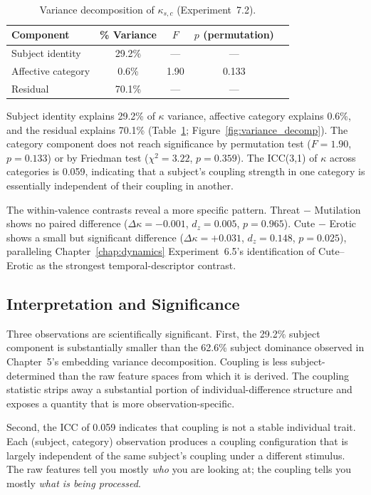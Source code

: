 \begin{table}[htbp]
\centering
\caption{Variance decomposition of $\kappa_{s,c}$ (Experiment~7.2).}
\label{tab:variance_decomp}
\small
\begin{tabular}{lcccc}
\toprule
\textbf{Component} & \textbf{\% Variance} & \textbf{$F$} & \textbf{$p$ (permutation)} \\
\midrule
Subject identity & 29.2\% & --- & --- \\
Affective category & 0.6\% & 1.90 & 0.133 \\
Residual & 70.1\% & --- & --- \\
\bottomrule
\end{tabular}
\end{table}

Subject identity explains 29.2\% of $\kappa$ variance, affective category explains 0.6\%, and the residual explains 70.1\% (Table~\ref{tab:variance_decomp}; Figure~\ref{fig:variance_decomp}). The category component does not reach significance by permutation test ($F = 1.90$, $p = 0.133$) or by Friedman test ($\chi^2 = 3.22$, $p = 0.359$). The ICC(3,1) of $\kappa$ across categories is 0.059, indicating that a subject's coupling strength in one category is essentially independent of their coupling in another.

The within-valence contrasts reveal a more specific pattern. Threat $-$ Mutilation shows no paired difference ($\Delta\kappa = -0.001$, $d_z = 0.005$, $p = 0.965$). Cute $-$ Erotic shows a small but significant difference ($\Delta\kappa = +0.031$, $d_z = 0.148$, $p = 0.025$), paralleling Chapter~\ref{chap:dynamics} Experiment~6.5's identification of Cute--Erotic as the strongest temporal-descriptor contrast.

\subsection{Interpretation and Significance}

Three observations are scientifically significant. First, the 29.2\% subject component is substantially smaller than the 62.6\% subject dominance observed in Chapter~5's embedding variance decomposition. Coupling is less subject-determined than the raw feature spaces from which it is derived. The coupling statistic strips away a substantial portion of individual-difference structure and exposes a quantity that is more observation-specific.

Second, the ICC of 0.059 indicates that coupling is not a stable individual trait. Each (subject, category) observation produces a coupling configuration that is largely independent of the same subject's coupling under a different stimulus. The raw features tell you mostly \emph{who} you are looking at; the coupling tells you mostly \emph{what is being processed}.

